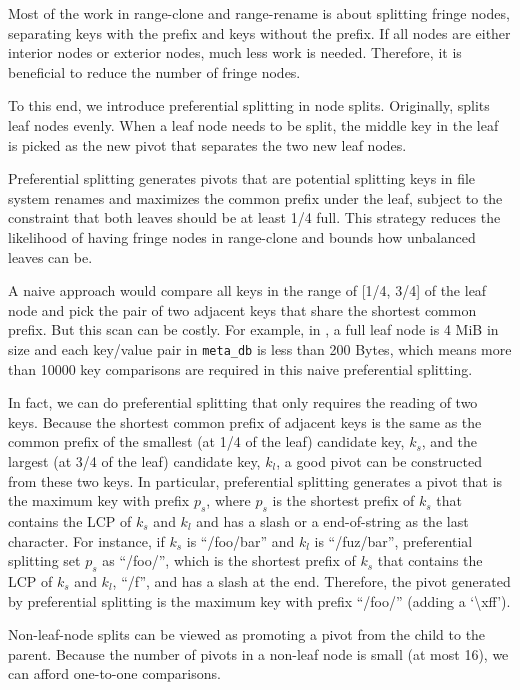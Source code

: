 Most of the work in range-clone and range-rename is about splitting fringe
nodes, separating keys with the prefix and keys without the prefix.
If all nodes are either interior nodes or exterior nodes, much less work is
needed.
Therefore, it is beneficial to reduce the number of fringe nodes.

To this end, we introduce preferential splitting in node splits.
Originally, \fti splits leaf nodes evenly.
When a leaf node needs to be split, the middle key in the leaf is picked as the
new pivot that separates the two new leaf nodes.

Preferential splitting generates pivots that are potential splitting keys in
file system renames and maximizes the common prefix under the leaf,
subject to the constraint that both leaves should be at least 1/4 full.
This strategy reduces the likelihood of having fringe nodes
in range-clone and bounds how unbalanced leaves can be.

A naive approach would compare all keys in the range of [1/4, 3/4] of the leaf
node and pick the pair of two adjacent keys that share the shortest common
prefix.
But this scan can be costly.
For example, in \betrfs, a full leaf node is 4 MiB in size and each key/value pair in
\texttt{meta\_db} is less than 200 Bytes, which means more than 10000 key
comparisons are required in this naive preferential splitting.

In fact, we can do preferential splitting that only requires the reading of two keys.
Because the shortest common prefix of adjacent keys is the same as the common
prefix of the smallest (at 1/4 of the leaf) candidate key, $k_{s}$, and
the largest (at 3/4 of the leaf) candidate key, $k_{l}$,
a good pivot can be constructed from these two keys.
In particular, preferential splitting generates a pivot that is the maximum key
with prefix $p_{s}$, where $p_{s}$ is the shortest prefix of $k_{s}$ that
contains the LCP of $k_{s}$ and $k_{l}$ and has a slash or a end-of-string as
the last character.
For instance, if $k_{s}$ is ``/foo/bar'' and $k_{l}$ is ``/fuz/bar'',
preferential splitting set $p_{s}$ as ``/foo/'', which is the shortest prefix
of $k_{s}$ that contains the LCP of $k_{s}$ and $k_{l}$, ``/f'', and has a
slash at the end.
Therefore, the pivot generated by preferential splitting is the maximum key with
prefix ``/foo/'' (adding a `\textbackslash xff').

Non-leaf-node splits can be viewed as promoting a pivot from the child to the
parent.
Because the number of pivots in a non-leaf node is small (at most 16), we can
afford one-to-one comparisons.

